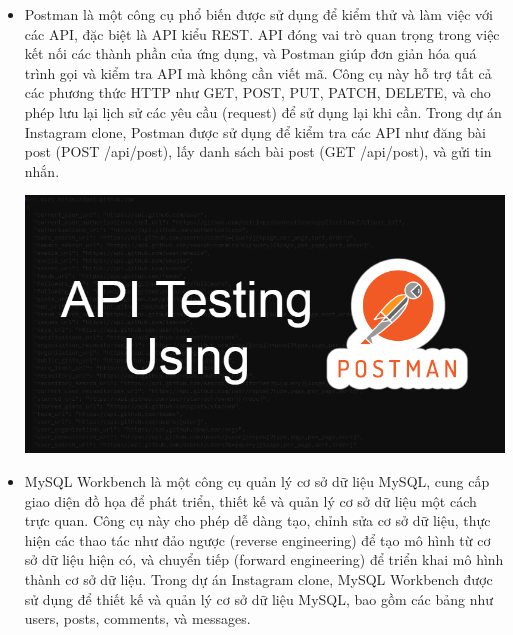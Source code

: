 \begin{itemize}
\item Postman là một công cụ phổ biến được sử dụng để kiểm thử và làm việc với các API, đặc biệt là API kiểu REST. API đóng vai trò quan trọng trong việc kết nối các thành phần của ứng dụng, và Postman giúp đơn giản hóa quá trình gọi và kiểm tra API mà không cần viết mã. Công cụ này hỗ trợ tất cả các phương thức HTTP như GET, POST, PUT, PATCH, DELETE, và cho phép lưu lại lịch sử các yêu cầu (request) để sử dụng lại khi cần. Trong dự án Instagram clone, Postman được sử dụng để kiểm tra các API như đăng bài post (POST /api/post), lấy danh sách bài post (GET /api/post), và gửi tin nhắn.

\includegraphics[width=\textwidth]{imgs/postman.png}
\end{itemize}

\begin{itemize}
\item MySQL Workbench là một công cụ quản lý cơ sở dữ liệu MySQL, cung cấp giao diện đồ họa để phát triển, thiết kế và quản lý cơ sở dữ liệu một cách trực quan. Công cụ này cho phép dễ dàng tạo, chỉnh sửa cơ sở dữ liệu, thực hiện các thao tác như đảo ngược (reverse engineering) để tạo mô hình từ cơ sở dữ liệu hiện có, và chuyển tiếp (forward engineering) để triển khai mô hình thành cơ sở dữ liệu. Trong dự án Instagram clone, MySQL Workbench được sử dụng để thiết kế và quản lý cơ sở dữ liệu MySQL, bao gồm các bảng như users, posts, comments, và messages.
\end{itemize}

